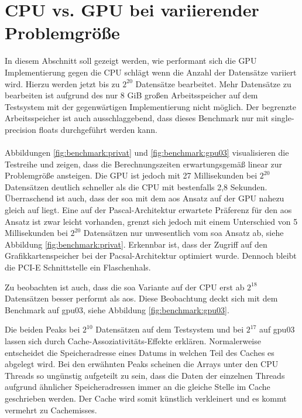 \section{CPU vs. GPU bei variierender Problemgröße}
In diesem Abschnitt soll gezeigt werden, wie performant sich die GPU Implementierung gegen die CPU schlägt wenn die Anzahl der Datensätze variiert wird. Hierzu werden jetzt bis zu $2^{20}$ Datensätze bearbeitet.
Mehr Datensätze zu bearbeiten ist aufgrund des nur 8 GiB großen Arbeitsspeicher auf dem Testsystem mit der gegenwärtigen Implementierung nicht möglich. Der begrenzte Arbeitsspeicher ist auch ausschlaggebend, dass dieses Benchmark nur mit single-precision floats durchgeführt werden kann.
\\\\
Abbildungen \ref{fig:benchmark:privat} und \ref{fig:benchmark:gpu03} visualisieren die Testreihe und zeigen, dass die Berechnungszeiten erwartungsgemäß linear zur Problemgröße ansteigen. Die GPU ist jedoch mit 27 Millisekunden bei $2^{20}$ Datensätzen deutlich schneller als die CPU mit bestenfalls 2,8 Sekunden. Überraschend ist auch, dass der \gls{soa} mit dem \gls{aos} Ansatz auf der GPU nahezu gleich auf liegt. Eine auf der Pascal-Architektur erwartete Präferenz für den \gls{aos} Ansatz ist zwar leicht vorhanden, grenzt sich jedoch mit einem Unterschied von 5 Millisekunden bei $2^{20}$ Datensätzen nur unwesentlich vom \gls{soa} Ansatz ab, siehe Abbildung \ref{fig:benchmark:privat}.
Erkennbar ist, dass der Zugriff auf den Grafikkartenspeicher bei der Pacsal-Architektur optimiert wurde. Dennoch bleibt die PCI-E Schnittstelle ein Flaschenhals.

Zu beobachten ist auch, dass die \gls{soa} Variante auf der CPU erst ab $2^{18}$ Datensätzen besser performt als \gls{aos}. Diese Beobachtung deckt sich mit dem Benchmark auf gpu03, siehe Abbildung \ref{fig:benchmark:gpu03}.

Die beiden Peaks bei $2^{10}$ Datensätzen auf dem Testsystem und bei $2^{17}$ auf gpu03 lassen sich durch Cache-Assoziativitäts-Effekte erklären. Normalerweise entscheidet die Speicheradresse eines Datums in welchen Teil des Caches es abgelegt wird. Bei den erwähnten Peaks scheinen die Arrays unter den CPU Threads so ungünstig aufgeteilt zu sein, dass die Daten der einzelnen Threads aufgrund ähnlicher Speicheradressen immer an die gleiche Stelle im Cache geschrieben werden. Der Cache wird somit künstlich verkleinert und es kommt vermehrt zu Cachemisses.



